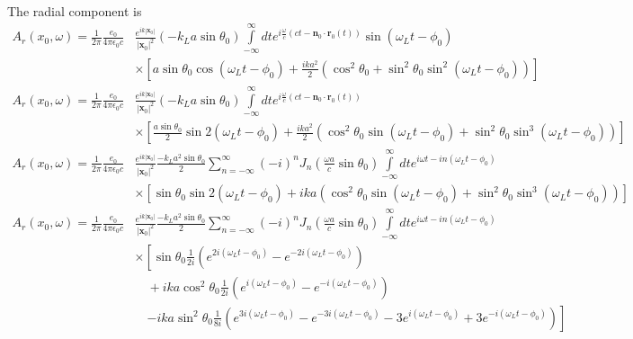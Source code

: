 The radial component is
\begin{align}
    A_r(x_0,\omega)=\frac1{2\pi}\frac{e_0 }{4\pi\epsilon_0 c} & \frac{e^{i k|{\bm x}_0|}}{|{\bm x}_0|^2}(-k_La\sin\theta_0)\int\limits_{-\infty}^{\infty}dt e^{i\frac{\omega}c\left(ct-{\bm n}_0\cdot{\bm r}_0(t)\right)}\sin(\omega_L t-\phi_0)\nonumber \\
                                                              & \times\left[a\sin\theta_0\cos(\omega_Lt-\phi_0)+\frac{ika^2}2\left(\cos^2\theta_0+\sin^2\theta_0\sin^2(\omega_Lt -\phi_0)\right)\right]
\end{align}
\begin{align}
    A_r(x_0,\omega)=\frac1{2\pi}\frac{e_0 }{4\pi\epsilon_0 c} & \frac{e^{i k|{\bm x}_0|}}{|{\bm x}_0|^2}(-k_La\sin\theta_0)\int\limits_{-\infty}^{\infty}dt e^{i\frac{\omega}c\left(ct-{\bm n}_0\cdot{\bm r}_0(t)\right)}\nonumber     \\
                                                              & \times\left[\frac{a\sin\theta_0}2\sin2(\omega_Lt-\phi_0)+\frac{ika^2}2\left(\cos^2\theta_0\sin(\omega_Lt-\phi_0)+\sin^2\theta_0\sin^3(\omega_Lt -\phi_0)\right)\right]
\end{align}
\begin{align}
    A_r(x_0,\omega)=\frac1{2\pi}\frac{e_0 }{4\pi\epsilon_0 c} & \frac{e^{i k|{\bm x}_0|}}{|{\bm x}_0|^2}\frac{-k_La^2\sin\theta_0}2\sum_{n=-\infty}^{\infty} (-i)^n J_n(\frac{\omega a}c\sin\theta_0)\int\limits_{-\infty}^{\infty}dt  e^{i\omega t-i n (\omega_Lt-\phi_0)}\nonumber \\
                                                              & \times\left[{\sin\theta_0}\sin2(\omega_Lt-\phi_0)+{ika}\left(\cos^2\theta_0\sin(\omega_Lt-\phi_0)+\sin^2\theta_0\sin^3(\omega_Lt -\phi_0)\right)\right]
\end{align}
\begin{align}
    A_r(x_0,\omega)=\frac1{2\pi}\frac{e_0 }{4\pi\epsilon_0 c} & \frac{e^{i k|{\bm x}_0|}}{|{\bm x}_0|^2}\frac{-k_La^2\sin\theta_0}2\sum_{n=-\infty}^{\infty} (-i)^n J_n(\frac{\omega a}c\sin\theta_0)\int\limits_{-\infty}^{\infty}dt  e^{i\omega t-i n (\omega_Lt-\phi_0)}\nonumber \\
                                                              & \times\left[{\sin\theta_0}\frac1{2i}\left(e^{2i(\omega_Lt-\phi_0)}-e^{-2i(\omega_Lt-\phi_0)}\right)\right.\nonumber                                                                                                  \\
                                                              & \quad +{ika}\cos^2\theta_0\frac1{2i}\left(e^{i(\omega_Lt-\phi_0)}-e^{-i(\omega_Lt-\phi_0)}\right)\nonumber                                                                                                           \\
                                                              & \quad\left.-ika\sin^2\theta_0\frac1{8i}\left(e^{3i(\omega_Lt-\phi_0)}-e^{-3i(\omega_Lt-\phi_0)}-3e^{i(\omega_Lt-\phi_0)}+3e^{-i(\omega_Lt-\phi_0)}\right)\right]
\end{align}
